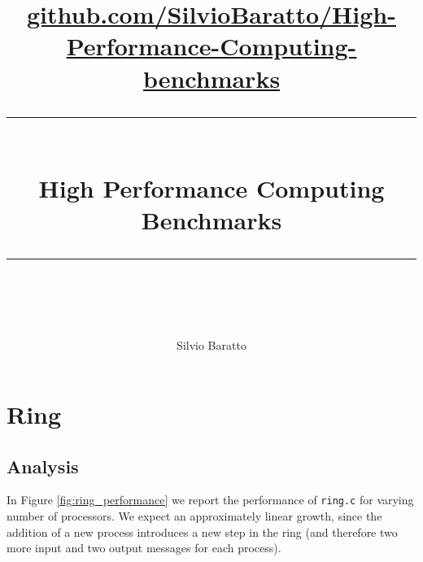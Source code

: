 \documentclass[11pt,a4paper]{article}
\begin{document}
\newcommand{\horrule}[1]{\rule{\linewidth}{#1}}
\lstset{language=Java} 
\lstset{basicstyle=\footnotesize\ttfamily}
\author{Silvio Baratto}
\title{
\normalfont \normalsize 
\href{https://github.com/SilvioBaratto/KD-tree}{github.com/SilvioBaratto/High-Performance-Computing-benchmarks} \\ [25pt] %
\horrule{0.5pt} \\[0.4cm] %
\huge High Performance Computing Benchmarks\\ %
\horrule{2pt} \\[0.5cm] %
}
\maketitle
\tableofcontents
\newpage
\section{Ring}
\subsection{Analysis}
In Figure \ref{fig:ring_performance} we report the performance of \texttt{ring.c} for varying number of processors. We expect an approximately linear growth, since the addition of a new process introduces a new step in the ring (and therefore two more input and two output messages for each process).
\end{document}
